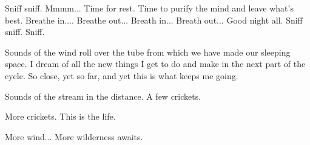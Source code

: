 Sniff sniff. Mmmm... Time for rest. Time to purify the mind and leave
what's best. Breathe in.... Breathe out... Breath in... Breath out...
Good night all. Sniff sniff. Sniff.

Sounds of the wind roll over the tube from which we have made our
sleeping space. I dream of all the new things I get to do and make in
the next part of the cycle. So close, yet so far, and yet this is what
keeps me going.

Sounds of the stream in the distance. A few crickets.

More crickets. This is the life.

More wind... More wilderness awaits.
